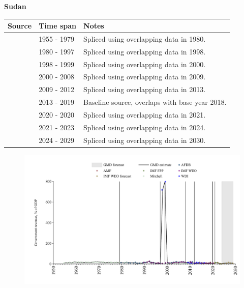 \documentclass[12pt,a4paper,landscape]{article}
\begin{document}
\begin{adjustbox}{max totalsize={\paperwidth}{\paperheight},center}
\begin{minipage}[t][\textheight][t]{\textwidth}
\vspace*{0.5cm}
{}
\begin{center}
{\Large\bfseries Sudan}
\end{center}
\vspace{0.5cm}
\begin{table}[H]
\centering
\small
\begin{tabular}{|l|l|l|}
\hline
\textbf{Source} & \textbf{Time span} & \textbf{Notes} \\
\hline
\rowcolor{white}\cite{Mitchell}& 1955 - 1979 &Spliced using overlapping data in 1980.\\
\rowcolor{lightgray}\cite{AFDB}& 1980 - 1997 &Spliced using overlapping data in 1998.\\
\rowcolor{white}\cite{WDI}& 1998 - 1999 &Spliced using overlapping data in 2000.\\
\rowcolor{lightgray}\cite{AFDB}& 2000 - 2008 &Spliced using overlapping data in 2009.\\
\rowcolor{white}\cite{WDI}& 2009 - 2012 &Spliced using overlapping data in 2013.\\
\rowcolor{lightgray}\cite{AMF}& 2013 - 2019 &Baseline source, overlaps with base year 2018.\\
\rowcolor{white}\cite{IMF_WEO}& 2020 - 2020 &Spliced using overlapping data in 2021.\\
\rowcolor{lightgray}\cite{IMF_FPP}& 2021 - 2023 &Spliced using overlapping data in 2024.\\
\rowcolor{white}\cite{IMF_WEO_forecast}& 2024 - 2029 &Spliced using overlapping data in 2030.\\
\hline
\end{tabular}
\end{table}
\begin{figure}[H]
\centering
\includegraphics[width=\textwidth,height=0.6\textheight,keepaspectratio]{graphs/SDN_govrev_GDP.pdf}
\end{figure}
\end{minipage}
\end{adjustbox}
\end{document}
